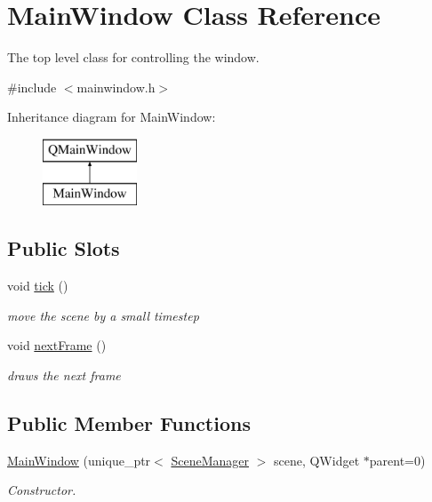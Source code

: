 \hypertarget{class_main_window}{}\section{Main\+Window Class Reference}
\label{class_main_window}


The top level class for controlling the window.  




{\ttfamily \#include $<$mainwindow.\+h$>$}

Inheritance diagram for Main\+Window\+:\begin{figure}[H]
\begin{center}
\leavevmode
\includegraphics[height=2.000000cm]{class_main_window}
\end{center}
\end{figure}
\subsection*{Public Slots}
\begin{DoxyCompactItemize}
\item 
\mbox{\label{class_main_window_a48965b8c40edf53d61e2d41977c1566d}} 
void \mbox{\hyperlink{class_main_window_a48965b8c40edf53d61e2d41977c1566d}{tick}} ()
\begin{DoxyCompactList}\small\item\em move the scene by a small timestep \end{DoxyCompactList}\item 
\mbox{\label{class_main_window_a4c2deac99b9b27dbb251d52380150515}} 
void \mbox{\hyperlink{class_main_window_a4c2deac99b9b27dbb251d52380150515}{next\+Frame}} ()
\begin{DoxyCompactList}\small\item\em draws the next frame \end{DoxyCompactList}\end{DoxyCompactItemize}
\subsection*{Public Member Functions}
\begin{DoxyCompactItemize}
\item 
\mbox{\hyperlink{class_main_window_af5ee499b2fb8e1ece871f21acc9dd332}{Main\+Window}} (unique\+\_\+ptr$<$ \mbox{\hyperlink{class_scene_manager}{Scene\+Manager}} $>$ scene, Q\+Widget $\ast$parent=0)
\begin{DoxyCompactList}\small\item\em Constructor. \end{DoxyCompactList}\end{DoxyCompactItemize}
